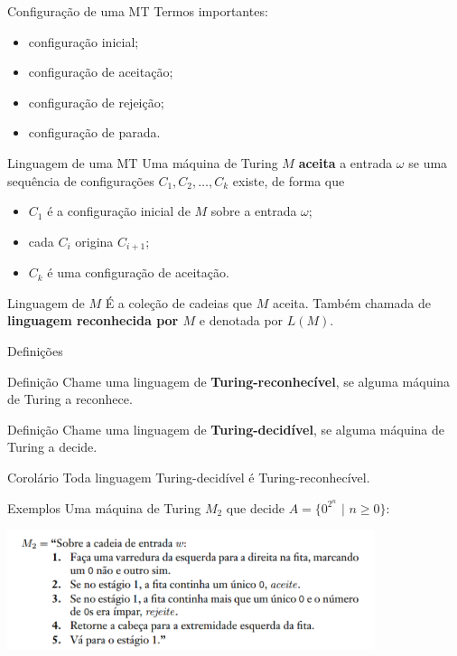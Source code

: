 \documentclass[xcolor=dvipsnames,table]{beamer}
\begin{document}
	\begin{frame}{Configuração de uma MT}
		Termos importantes:
		\begin{itemize}
			\item configuração inicial;
			\item configuração de aceitação;
			\item configuração de rejeição;
			\item configuração de parada.
		\end{itemize}
	\end{frame}
	
	\begin{frame}{Linguagem de uma MT}
		Uma máquina de Turing $M$ {\bf aceita} a entrada $\omega$ se uma sequência de configurações $C_1, C_2, \ldots, C_k$ existe, de forma que 
		\begin{itemize}
			\item $C_1$ é a configuração inicial de $M$ sobre a entrada $\omega$;
			\item cada $C_i$ origina $C_{i+1}$;
			\item $C_k$ é uma configuração de aceitação.
		\end{itemize} \pause
		
		\begin{block}{Linguagem de $M$}
			É a coleção de cadeias que $M$ aceita. Também chamada de {\bf linguagem reconhecida por $M$} e denotada por $L(M)$.
		\end{block}		
	\end{frame}
	
	\begin{frame}{Definições}
		\begin{block}{Definição}
			Chame uma linguagem de {\bf Turing-reconhecível}, se alguma máquina de Turing a reconhece.
		\end{block} \pause
		\begin{block}{Definição}
			Chame uma linguagem de {\bf Turing-decidível}, se alguma máquina de Turing a decide.
		\end{block}\pause
		\begin{block}{Corolário}
			Toda linguagem Turing-decidível é Turing-reconhecível.
		\end{block}
	\end{frame}		
	
	\begin{frame}{Exemplos}
		Uma máquina de Turing $M_2$ que decide $A = \{ 0^{2^n} \mbox{ | } n \geq 0 \}$: \pause
		\begin{center}
			\includegraphics[height=3.5cm]{images/m2.png}
		\end{center}
	\end{frame}
	
\end{document}
